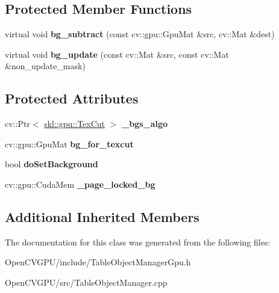 \subsection*{Protected Member Functions}
\begin{DoxyCompactItemize}
\item 
\hypertarget{classskl_1_1gpu_1_1_table_object_manager_a54ae21fe001b5dfe605004be798ddd05}{}\label{classskl_1_1gpu_1_1_table_object_manager_a54ae21fe001b5dfe605004be798ddd05} 
virtual void {\bfseries bg\+\_\+subtract} (const cv\+::gpu\+::\+Gpu\+Mat \&src, cv\+::\+Mat \&dest)
\item 
\hypertarget{classskl_1_1gpu_1_1_table_object_manager_a39dfb2a4da44e15fc82acaf4e9c2ada1}{}\label{classskl_1_1gpu_1_1_table_object_manager_a39dfb2a4da44e15fc82acaf4e9c2ada1} 
virtual void {\bfseries bg\+\_\+update} (const cv\+::\+Mat \&src, const cv\+::\+Mat \&non\+\_\+update\+\_\+mask)
\end{DoxyCompactItemize}
\subsection*{Protected Attributes}
\begin{DoxyCompactItemize}
\item 
\hypertarget{classskl_1_1gpu_1_1_table_object_manager_a799ccd9c25994262f4016c0c74486a1d}{}\label{classskl_1_1gpu_1_1_table_object_manager_a799ccd9c25994262f4016c0c74486a1d} 
cv\+::\+Ptr$<$ \hyperlink{classskl_1_1gpu_1_1_tex_cut}{skl\+::gpu\+::\+Tex\+Cut} $>$ {\bfseries \+\_\+bgs\+\_\+algo}
\item 
\hypertarget{classskl_1_1gpu_1_1_table_object_manager_a70c2b67b0afe1ad3ac4a2d7209e1b142}{}\label{classskl_1_1gpu_1_1_table_object_manager_a70c2b67b0afe1ad3ac4a2d7209e1b142} 
cv\+::gpu\+::\+Gpu\+Mat {\bfseries bg\+\_\+for\+\_\+texcut}
\item 
\hypertarget{classskl_1_1gpu_1_1_table_object_manager_ab48f43306b5113b29550519495d38482}{}\label{classskl_1_1gpu_1_1_table_object_manager_ab48f43306b5113b29550519495d38482} 
bool {\bfseries do\+Set\+Background}
\item 
\hypertarget{classskl_1_1gpu_1_1_table_object_manager_aab6b340446a6a7d590d30d02744d45bf}{}\label{classskl_1_1gpu_1_1_table_object_manager_aab6b340446a6a7d590d30d02744d45bf} 
cv\+::gpu\+::\+Cuda\+Mem {\bfseries \+\_\+page\+\_\+locked\+\_\+bg}
\end{DoxyCompactItemize}
\subsection*{Additional Inherited Members}


The documentation for this class was generated from the following files\+:\begin{DoxyCompactItemize}
\item 
Open\+C\+V\+G\+P\+U/include/Table\+Object\+Manager\+Gpu.\+h\item 
Open\+C\+V\+G\+P\+U/src/Table\+Object\+Manager.\+cpp\end{DoxyCompactItemize}
